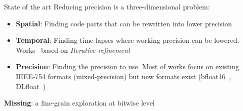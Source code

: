 \documentclass[10pt]{beamer}
\begin{document}
\begin{frame}{State of the art}
    Reducing precision is a three-dimensional problem:
    \begin{itemize}
        \item \textbf{\alert{Spatial}}: 
        Finding code parts that can be rewritten into lower precision~\cite{rubio2013precimonious,lam2013,graillat2016promise,rubio2016floating}
        \item \textbf{\alert{Temporal}}:
        Finding time lapses where working precision can be lowered.
        Works~\cite{anzt2017adaptive,haidar2018harnessing} based on \emph{Iterative refinement}~\cite{wilkinson1994rounding}
        \item \textbf{\alert{Precision}}:
        Finding the precision to use.
        Most of works focus on existing IEEE-754 formats (mixed-precision)
        but new formats exist (bfloat16~\cite{bfloat16}, DLfloat~\cite{dlfloat})
    \end{itemize} 
    \alert{\textbf{Missing}}: a fine-grain exploration at bitwise level
\end{frame}
\end{document}
